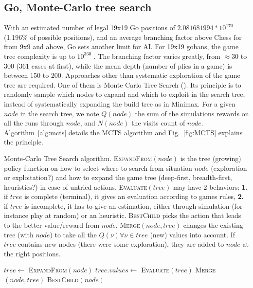 \subsection{Go, Monte-Carlo tree search}
With an estimated number of legal 19x19 Go positions of $2.081681994 * 10^{170}$ \citep{tromp2006} (1.196\% of possible positions), and an average branching factor above Chess for  from 9x9 and above, Go sets another limit for AI. For 19x19 gobans, the game tree complexity is up to $10^{360}$ \citep{allis1994}. The branching factor varies greatly, from $\approx 30$ to $300$ (361 cases at first), while the mean depth (number of plies in a game) is between 150 to 200. Approaches other than systematic exploration of the game tree are required. One of them is Monte Carlo Tree Search (). Its principle is to randomly sample which nodes to expand and which to exploit in the search tree, instead of systematically expanding the build tree as in Minimax. For a given $node$ in the search tree, we note $Q(node)$ the sum of the simulations rewards on all the runs through $node$, and $N(node)$ the visits count of $node$. Algorithm~\ref{alg:mcts} details the MCTS algorithm and Fig.~\ref{fig:MCTS} explains the principle.

\begin{algorithm}
\caption{Monte-Carlo Tree Search algorithm. 
\textsc{ExpandFrom}$(node)$ is the tree (growing) policy function on how to select where to search from situation $node$ (exploration or exploitation?) and how to expand the game tree (deep-first, breadth-first, heuristics?) in case of untried actions. \textsc{Evaluate}$(tree)$ may have 2 behaviors: \textbf{1.} if $tree$ is complete (terminal), it gives an evaluation according to games rules, \textbf{2.} if $tree$ is incomplete, it has to give an estimation, either through simulation (for instance play at random) or an heuristic. \textsc{BestChild} picks the action that leads to the better value/reward from $node$. \textsc{Merge}$(node, tree)$ changes the existing tree (with $node$) to take all the $Q(\nu) \forall \nu \in tree$ (new) values into account. If $tree$ contains new nodes (there were some exploration), they are added to $node$ at the right positions.}
\label{alg:mcts}
\begin{algorithmic}
        \State $tree \gets$ \textsc{ExpandFrom}$(node)$
        \State $tree.values \gets$ \textsc{Evaluate}$(tree)$
        \State \textsc{Merge}$(node, tree)$
    \EndWhile
    \State \Return \textsc{BestChild}$(node)$
\EndFunction
\end{algorithmic}
\end{algorithm}


